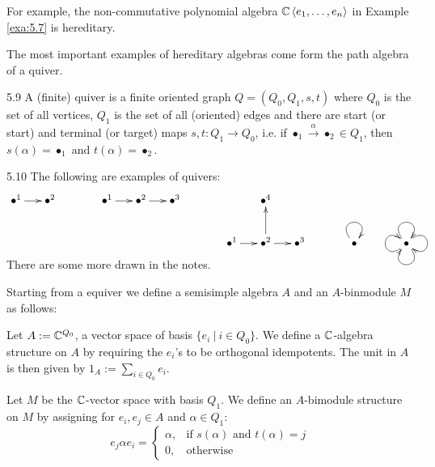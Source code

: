 \documentclass[twoside = false,	%
		headsepline,		%
		parskip = true,
		]{scrbook}						%
\begin{document}
    For example, the non-commutative polynomial algebra $\mathbb C \left\langle e_1,\dots,e_n\right\rangle$ in Example \ref{exa:5.7} is hereditary.

    The most important examples of hereditary algebras come form the path algebra of a quiver.

    \begin{definition}{}{5.9}
        A (finite) quiver is a finite oriented graph $Q = (Q_0,Q_1,s,t)$ where $Q_0$ is the set of all vertices, $Q_1$ is the set of all (oriented) edges and there are start (or start) and terminal (or target) maps $s,t: Q_1 \to Q_0$, i.e. if $\bullet_1 \xrightarrow{\alpha} \bullet_2 \in Q_1$, then $s(\alpha) = \bullet_1$ and $t(\alpha) = \bullet_2$.
    \end{definition}

    \begin{example}{}{5.10}
        The following are examples of quivers:
        \begin{equation*}
        \xymatrix @C=15pt {
            \bullet^1 \ar[r] & \bullet^2 & & \bullet^1 \ar[r] & \bullet^2 \ar[r] & \bullet^3 & & & \bullet^4 \\
            & & & & & & & \bullet^1 \ar[r] & \bullet^2 \ar[r] \ar[u]  & \bullet^3 & & \bullet \ar@(ul,ur) & & \bullet \ar@(ul,ur) \ar@(ur,dr) \ar@(dr,dl) \ar@(dl,ul)
        }
        \end{equation*}
        There are some more drawn in the notes.
    \end{example}

    Starting from a equiver we define a semisimple algebra $A$ and an $A$-binmodule $M$ as follows:

    Let $A:=\mathbb C^{Q_0}$, a vector space of basis $\{e_i \ | \ i \in Q_0\}$. We define a $\mathbb C$-algebra structure on $A$ by requiring the $e_i$'s to be orthogonal idempotents. The unit in $A$ is then given by $1_A:= \sum_{i \in Q_0} e_i$.

    Let $M$ be the $\mathbb C$-vector space with basis $Q_1$. We define an $A$-bimodule structure on $M$ by assigning for $e_i,e_j \in A$ and $\alpha \in Q_1$:
    \begin{equation*}
        e_j \alpha e_i = \left\{ \begin{array}{cl}
            \alpha, & \text{if } s(\alpha) \text{ and } t(\alpha) = j  \\
            0, & \text{otherwise}
        \end{array}\right.
    \end{equation*}
\end{document}
